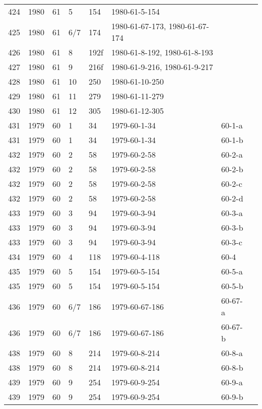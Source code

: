 \begin{longtable}{ |l|l|l|l|l|l|l|l| }
424 & 1980 & 61 &     5 &     154 & 1980-61-5-154  &  & \\
425 & 1980 & 61 &   6/7 &     174 & 1980-61-67-173, 1980-61-67-174 &  & \\
426 & 1980 & 61 &     8 &    192f & 1980-61-8-192, 1980-61-8-193 &  & \\
427 & 1980 & 61 &     9 &    216f & 1980-61-9-216, 1980-61-9-217 &  & \\
428 & 1980 & 61 &    10 &     250 & 1980-61-10-250 &  & \\
429 & 1980 & 61 &    11 &     279 & 1980-61-11-279 &  & \\
430 & 1980 & 61 &    12 &     305 & 1980-61-12-305 &  & \\
431 & 1979 & 60 &     1 &      34 & 1979-60-1-34   & 60-1-a & \\
431 & 1979 & 60 &     1 &      34 & 1979-60-1-34   & 60-1-b & \\
432 & 1979 & 60 &     2 &      58 & 1979-60-2-58   & 60-2-a & \\
432 & 1979 & 60 &     2 &      58 & 1979-60-2-58   & 60-2-b & \\
432 & 1979 & 60 &     2 &      58 & 1979-60-2-58   & 60-2-c & \\
432 & 1979 & 60 &     2 &      58 & 1979-60-2-58   & 60-2-d & \\
433 & 1979 & 60 &     3 &      94 & 1979-60-3-94   & 60-3-a & \\
433 & 1979 & 60 &     3 &      94 & 1979-60-3-94   & 60-3-b & \\
433 & 1979 & 60 &     3 &      94 & 1979-60-3-94   & 60-3-c & \\
434 & 1979 & 60 &     4 &     118 & 1979-60-4-118  & 60-4 & \\
435 & 1979 & 60 &     5 &     154 & 1979-60-5-154  & 60-5-a & \\
435 & 1979 & 60 &     5 &     154 & 1979-60-5-154  & 60-5-b & \\
436 & 1979 & 60 &   6/7 &     186 & 1979-60-67-186 & 60-67-a & \\
436 & 1979 & 60 &   6/7 &     186 & 1979-60-67-186 & 60-67-b & \\
438 & 1979 & 60 &     8 &     214 & 1979-60-8-214  & 60-8-a & \\
438 & 1979 & 60 &     8 &     214 & 1979-60-8-214  & 60-8-b & \\
439 & 1979 & 60 &     9 &     254 & 1979-60-9-254  & 60-9-a & \\
439 & 1979 & 60 &     9 &     254 & 1979-60-9-254  & 60-9-b & \\

\end{longtable}

